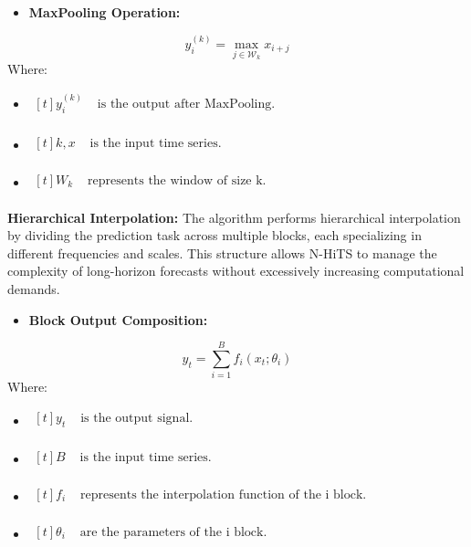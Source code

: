 \documentclass{ieeeojies}
\begin{document}
\begin{itemize}
    \item  \textbf{MaxPooling Operation:} 
\end{itemize}
\begin{equation}
y_i^{(k)} = \max_{j \in \mathcal{W}_k} x_{i+j}
\end{equation}
Where: 
\begin{itemize}
    \item $\begin{aligned}[t]
            y_i^{(k)} & \text{ is the output after MaxPooling.} \\
            \end{aligned}$
    \item $\begin{aligned}[t]
            k, x & \text{ is the input time series.} \\
            \end{aligned}$
    \item $\begin{aligned}[t]
            {W}_k & \text{ represents the window of size k.} \\
            \end{aligned}$
\end{itemize}

\textbf{Hierarchical Interpolation:} The algorithm performs hierarchical interpolation by dividing the prediction task across multiple blocks, each specializing in different frequencies and scales. This structure allows N-HiTS to manage the complexity of long-horizon forecasts without excessively increasing computational demands.

\begin{itemize}
    \item  \textbf{Block Output Composition:} 
\end{itemize}
\begin{equation}
y_t = \sum_{i=1}^B f_i(x_t; \theta_i)
\end{equation}
Where: 
\begin{itemize}
    \item $\begin{aligned}[t]
            y_t & \text{ is the output signal.} \\
            \end{aligned}$
    \item $\begin{aligned}[t]
            B & \text{ is the input time series.} \\
            \end{aligned}$
    \item $\begin{aligned}[t]
            f_i & \text{ represents the interpolation function of the i block.} \\
            \end{aligned}$
    \item $\begin{aligned}[t]
            \theta_i & \text{ are the parameters of the i block.} \\
            \end{aligned}$
\end{itemize}
\end{document}
